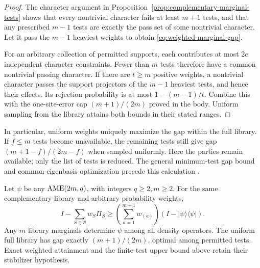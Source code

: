 \begin{proof}
The character argument in Proposition~\ref{prop:complementary-marginal-tests}
shows that every nontrivial character fails at least \(m+1\) tests, and
that any prescribed \(m-1\) tests are exactly the pass set of some
nontrivial character.  Let it pass the \(m-1\) heaviest weights to obtain
\eqref{eq:weighted-marginal-gap}.

For an arbitrary collection of permitted supports, each contributes at
most \(2e\) independent character constraints.  Fewer than \(m\) tests
therefore have a common nontrivial passing character.  If there are
\(t\geq m\) positive weights, a nontrivial character passes the support
projectors of the \(m-1\) heaviest tests, and hence their effects.  Its
rejection probability is at most \(1-(m-1)/t\).  Combine this with the
one-site-error cap \((m+1)/(2m)\) proved in the body.  Uniform sampling
from the library attains both bounds in their stated ranges.
\end{proof}

In particular, uniform weights uniquely maximize the gap within the full
library.  If \(f\leq m\) tests become unavailable, the remaining tests
still give gap \((m+1-f)/(2m-f)\) when sampled uniformly.  Here the
parties remain available; only the list of tests is reduced.
The general minimum-test gap bound and common-eigenbasis optimization
precede this calculation \cite[Proposition~1 and Section~V.B]{DangniamHanZhu2020}.

\begin{proposition}
\label{prop:universal-marginal-verification}
Let \(\psi\) be any \(\mathrm{AME}(2m,q)\), with integers \(q\geq2,m\geq2\).
For the same complementary library and arbitrary probability weights,
\begin{equation}
 I-\sum_{S\in\mathcal S}w_S\Pi_S
 \geq\left(\sum_{a=1}^{m+1}w_{(a)}\right)
       (I-|\psi\rangle\langle\psi|).
 \label{eq:universal-weighted-gap}
\end{equation}
Any \(m\) library marginals determine \(\psi\) among all density
operators.  The uniform full library has gap exactly \((m+1)/(2m)\),
optimal among permitted tests.  Exact weighted attainment and the
finite-test upper bound above retain their stabilizer hypothesis.
\end{proposition}

